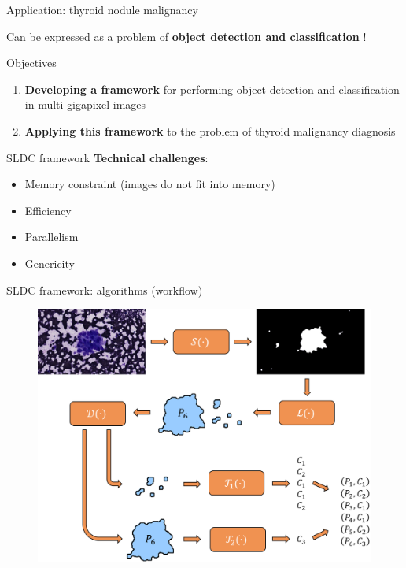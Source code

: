 \documentclass{beamer}
\begin{document}
\begin{frame}{Application: thyroid nodule malignancy}
	\begin{center}
		\Large
		Can be expressed as a problem of \textbf{object detection and classification} !
	\end{center}	
\end{frame}

\begin{frame}{Objectives}

	\begin{enumerate}
		\item \textbf{Developing a framework} for performing object detection and classification in multi-gigapixel images
		\vspace{1cm}
		\item \textbf{Applying this framework} to the problem of thyroid malignancy diagnosis
	\end{enumerate}

\end{frame}


\begin{frame}{SLDC framework}
	\textbf{Technical challenges}:
	\begin{itemize}
		\item Memory constraint (images do not fit into memory)
		\item Efficiency
		\item Parallelism
		\item Genericity
	\end{itemize}
\end{frame}


\begin{frame}{SLDC framework: algorithms (workflow)}
	\begin{figure}
		\includegraphics[scale=0.45]{images/workflow_illustration.png}
	\end{figure}
\end{frame}
\end{document}
